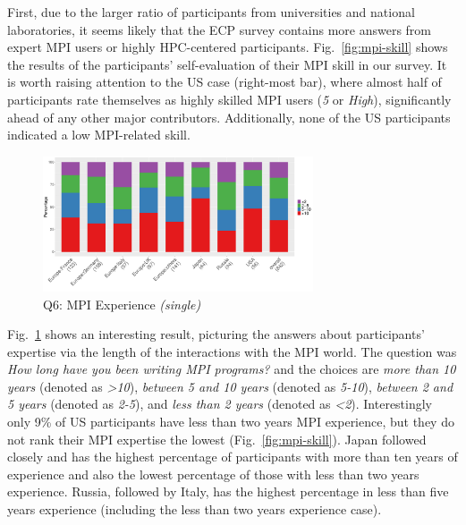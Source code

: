 \documentclass[preprint,5p,times]{elsarticle}
\def\myquote#1{{\it #1}}
\newcommand{\revision}[2]{{\color{blue}#2}}
\def\mcountries{major contributors\xspace{}}%
\begin{document}
First, due to the larger ratio of participants from universities
and national laboratories, it seems likely that the ECP survey contains more
answers from expert MPI users or highly HPC-centered participants.
Fig.~\ref{fig:mpi-skill} shows the results of \revision{}{the} participants' self-evaluation of their MPI skill in our survey. It is worth raising attention to the US
case (right-most bar), where almost half of participants rate themselves as
highly skilled MPI users (\myquote{5} or \myquote{High}), significantly ahead
of any other \mcountries. Additionally, none of the US participants
indicated a low MPI-related skill.

\begin{figure}[tb]
  \begin{center}
    \includegraphics[width=8.0cm]{R-scripts/Q6.pdf}
    \vspace{-1.5mm}
    \caption{Q6: MPI Experience {\it(single)}}
    \label{fig:mpi-experience}
\vspace{-3mm}%
  \end{center}
\end{figure}

Fig.~\ref{fig:mpi-experience} shows an interesting result, picturing the answers
about participants' expertise via the length of the interactions with the MPI
world. The question was {\it How long have you been writing MPI programs?} and
the choices are {\it more than 10 years} (denoted as \myquote{\textgreater 10}),
\myquote{between 5 and 10 years} (denoted as \myquote{5-10}), \myquote{between 2
and 5 years} (denoted as \myquote{2-5}), and \myquote{less than 2 years} (denoted
as \myquote{\textless 2}). Interestingly only 9\% of US participants have less
than \revision{2}{two} years MPI experience, but they do
\revision{no}{not} rank their MPI expertise the lowest
(Fig.~\ref {fig:mpi-skill}). Japan followed closely \revision{}{and} has the highest percentage
of participants with more than \revision{10}{ten} years of experience
and also the lowest
percentage of those with less than \revision{2}{two} years experience. Russia, followed by
Italy, has the highest percentage in less than \revision{5}{five} years experience (including the
less than \revision{2}{two} years experience case).
\end{document}
